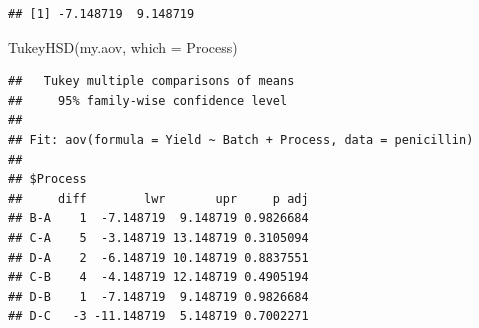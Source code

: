 \documentclass[
]{book}
\newenvironment{Shaded}{\begin{snugshade}}{\end{snugshade}}
\newcommand{\AttributeTok}[1]{\textcolor[rgb]{0.77,0.63,0.00}{#1}}
\newcommand{\DecValTok}[1]{\textcolor[rgb]{0.00,0.00,0.81}{#1}}
\newcommand{\FloatTok}[1]{\textcolor[rgb]{0.00,0.00,0.81}{#1}}
\newcommand{\FunctionTok}[1]{\textcolor[rgb]{0.00,0.00,0.00}{#1}}
\newcommand{\NormalTok}[1]{#1}
\newcommand{\SpecialCharTok}[1]{\textcolor[rgb]{0.00,0.00,0.00}{#1}}
\newcommand{\StringTok}[1]{\textcolor[rgb]{0.31,0.60,0.02}{#1}}
\begin{document}
\begin{Shaded}
\end{Shaded}

\begin{verbatim}
## [1] -7.148719  9.148719
\end{verbatim}

\begin{Shaded}
\begin{Highlighting}[]
\FunctionTok{TukeyHSD}\NormalTok{(my.aov, }\AttributeTok{which =} \StringTok{\textquotesingle{}Process\textquotesingle{}}\NormalTok{)}
\end{Highlighting}
\end{Shaded}

\begin{verbatim}
##   Tukey multiple comparisons of means
##     95% family-wise confidence level
## 
## Fit: aov(formula = Yield ~ Batch + Process, data = penicillin)
## 
## $Process
##     diff        lwr       upr     p adj
## B-A    1  -7.148719  9.148719 0.9826684
## C-A    5  -3.148719 13.148719 0.3105094
## D-A    2  -6.148719 10.148719 0.8837551
## C-B    4  -4.148719 12.148719 0.4905194
## D-B    1  -7.148719  9.148719 0.9826684
## D-C   -3 -11.148719  5.148719 0.7002271
\end{verbatim}
\end{document}
